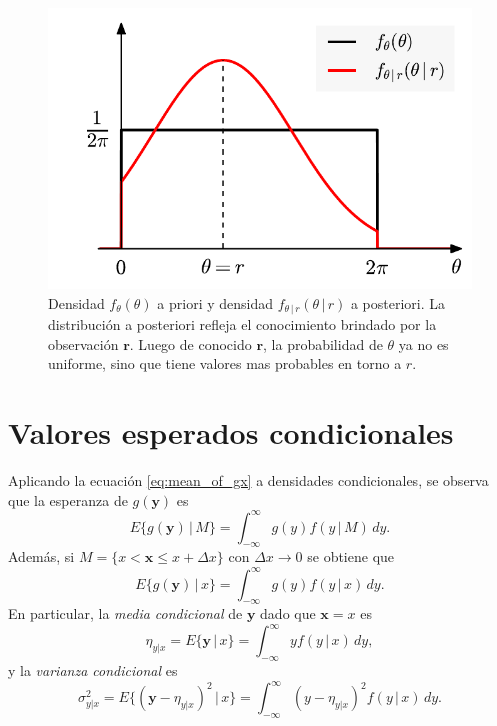 \documentclass[a4paper]{report}
\newcommand{\x}{\mathbf{x}}
\newcommand{\y}{\mathbf{y}}
\begin{document}
\begin{figure}[!htb]
  \begin{minipage}[c]{0.47\textwidth}
    \includegraphics[width=\textwidth]{figuras/random_phase_posterior_probability.pdf}
  \end{minipage}\hfill
  \begin{minipage}[c]{0.5\textwidth}
    \caption{
       Densidad \(f_\theta(\theta)\) a priori y densidad \(f_{\theta\,|\,r}(\theta\,|\,r)\) a posteriori. La distribución a posteriori refleja el conocimiento brindado por la observación \(\mathbf{r}\). Luego de conocido \(\mathbf{r}\), la probabilidad de \(\theta\) ya no es uniforme, sino que tiene valores mas probables en torno a \(r\).
    } \label{fig:random_phase_posterior_probability}
  \end{minipage}
\end{figure}

\section{Valores esperados condicionales}

Aplicando la ecuación \ref{eq:mean_of_gx} a densidades condicionales, se observa que la esperanza de \(g(\y)\) es
\begin{equation}\label{eq:conditional_mean_of_g_definition}
 E\{g(\y)\,|\,M\}=\int_{-\infty}^{\infty}g(y)f(y\,|\,M)\,dy.
\end{equation}
Además, si \(M=\{x<\x\leq x+\Delta x\}\) con \(\Delta x\to 0\) se obtiene que 
\[
 E\{g(\y)\,|\,x\}=\int_{-\infty}^{\infty}g(y)f(y\,|\,x)\,dy.
\]
En particular, la \emph{media condicional} de \(\y\) dado que \(\x=x\) es 
\begin{equation}\label{eq:conditional_mean_definition}
 \eta_{y|x}=E\{\y\,|\,x\}=\int_{-\infty}^{\infty}yf(y\,|\,x)\,dy,
\end{equation}
y la \emph{varianza condicional} es
\[
 \sigma^2_{y|x}=E\{(\y-\eta_{y|x})^2\,|\,x\}=\int_{-\infty}^{\infty}(y-\eta_{y|x})^2f(y\,|\,x)\,dy.
\]
\end{document}
